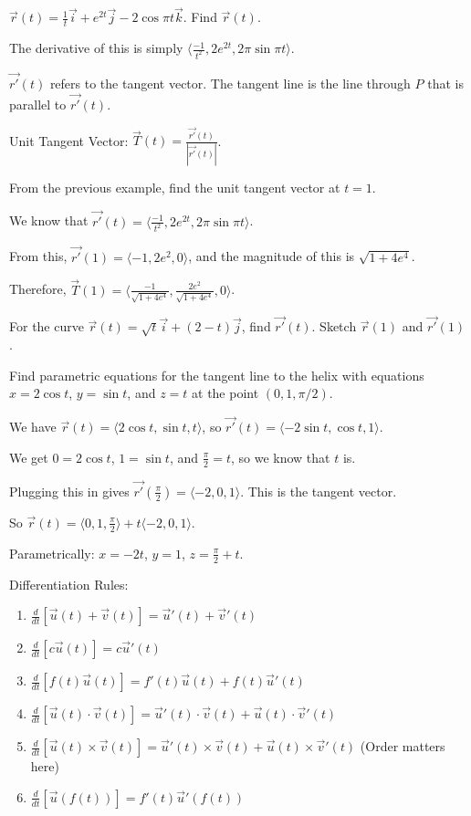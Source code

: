 \documentclass[../calc3.tex]{subfiles}
\begin{document}
\begin{example}
    $\vec{r}(t) = \frac{1}{t}\vec{i}+e^{2t}\vec{j}-2\cos\pi t\vec{k}$. Find $\vec{r}(t)$.

    The derivative of this is simply $\langle \frac{-1}{t^2},2e^{2t}, 2\pi\sin\pi t\rangle$.
\end{example}

$\vec{r'}(t)$ refers to the tangent vector. The tangent line is the line through $P$ that is parallel to $\vec{r'}(t)$. 

Unit Tangent Vector: $\vec{T}(t)=\frac{\vec{r'}(t)}{|\vec{r'}(t)|}$.

\begin{example}
    From the previous example, find the unit tangent vector at $t=1$.

    We know that $\vec{r'}(t)=\langle \frac{-1}{t^2},2e^{2t}, 2\pi\sin\pi t\rangle$. 

    From this, $\vec{r'}(1)=\langle -1,2e^2,0\rangle$, and the magnitude of this is $\sqrt{1+4e^4}$.

    Therefore, $\vec{T}(1)=\langle \frac{-1}{\sqrt{1+4e^4}}, \frac{2e^2}{\sqrt{1+4e^4}}, 0\rangle$.
\end{example}

\ex For the curve $\vec{r}(t)=\sqrt{t}\vec{i}+(2-t)\vec{j}$, find $\vec{r'}(t)$. Sketch $\vec{r}(1)$ and $\vec{r'}(1)$.

\pagebreak
\begin{example}
    Find parametric equations for the tangent line to the helix with equations $x=2\cos t$, $y=\sin t$, and $z=t$ at the point $(0,1,\pi/2)$.

    We have $\vec{r}(t)=\langle 2\cos t,\sin t, t\rangle$, so $\vec{r'}(t)=\langle -2\sin t,\cos t,1\rangle$.

    We get $0=2\cos t$, $1=\sin t$, and $\frac{\pi}{2}=t$, so we know that $t$ is.
    
    Plugging this in gives $\vec{r'}\left(\frac{\pi}{2}\right) = \langle -2,0,1\rangle$. This is the tangent vector.

    So $\vec{r}(t)=\langle 0,1,\frac{\pi}{2}\rangle + t\langle -2,0,1\rangle$. 

    Parametrically: $x=-2t$, $y=1$, $z=\frac{\pi}{2}+t$.
\end{example}

Differentiation Rules:
\begin{enumerate}
    \item $\frac{d}{dt}[\vec{u}(t)+\vec{v}(t)]=\vec{u}'(t)+\vec{v}'(t)$
    \item $\frac{d}{dt}[c\vec{u}(t)]=c\vec{u}'(t)$
    \item $\frac{d}{dt}[f(t)\vec{u}(t)]=f'(t)\vec{u}(t)+f(t)\vec{u}'(t)$
    \item $\frac{d}{dt}[\vec{u}(t)\cdot \vec{v}(t)]=\vec{u}'(t)\cdot\vec{v}(t)+\vec{u}(t)\cdot \vec{v}'(t)$
    \item $\frac{d}{dt}[\vec{u}(t)\times \vec{v}(t)]=\vec{u}'(t)\times \vec{v}(t)+\vec{u}(t)\times \vec{v}'(t)$ (Order matters here)
    \item $\frac{d}{dt}[\vec{u}(f(t))]=f'(t)\vec{u}'(f(t))$
\end{enumerate}
\end{document}
